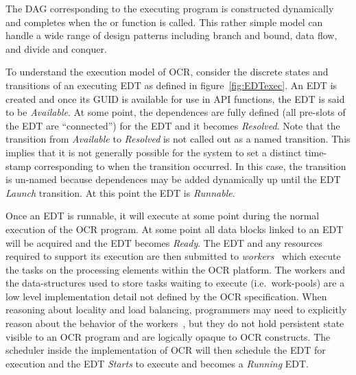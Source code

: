 The DAG corresponding to the executing program is constructed
dynamically and completes when the
 or  function is called.
This rather simple model can handle a wide range of
design patterns including branch and bound, data flow, and divide and
conquer.
%
%

To understand the execution model of OCR, consider the discrete states and
transitions of an executing EDT as defined in figure~\ref{fig:EDTexec}. An
EDT is created and once its GUID is available for use in API
functions, the EDT is said to be \emph{Available}. At some point, the dependences are fully defined (all
pre-slots of the EDT are ``connected'') for the EDT and it becomes
\emph{Resolved}.
Note that the transition from \emph{Available} to \emph{Resolved} is
not called out as a named transition. This implies that it is not
generally possible for the system to set a distinct time-stamp
corresponding to when the transition occurred. In this case, the transition is un-named
because dependences may be added dynamically up until the
EDT \emph{Launch} transition. At this point the
EDT is \emph{Runnable}.

Once an EDT is runnable, it will execute at some point during the normal execution
of the OCR program. At some point all data blocks linked to an EDT
will be acquired and the EDT becomes \emph{Ready}. The
EDT and any resources required to support its execution are then submitted to
\emph{workers}~\cite{GBRS09} which execute the tasks on
the processing elements within the OCR platform. The workers and the
data-structures used to store tasks waiting to execute
(i.e.\ work-pools) are a low level implementation detail not defined by
the OCR specification. When reasoning about locality and load
balancing, programmers may need to explicitly reason about the
behavior of the workers~\cite{Chatterjee13}, but they do not hold
persistent state visible to an OCR program and are logically opaque to
OCR constructs. The scheduler inside the implementation of OCR
will then schedule the EDT for execution and the EDT
\emph{Starts} to execute and
becomes a \emph{Running} EDT.

